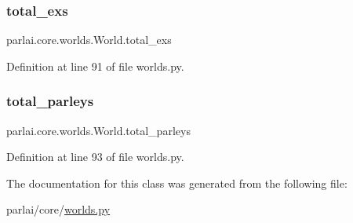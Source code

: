 \subsubsection{\texorpdfstring{total\+\_\+exs}{total\_exs}}
{\footnotesize\ttfamily parlai.\+core.\+worlds.\+World.\+total\+\_\+exs}



Definition at line 91 of file worlds.\+py.

\mbox{\label{classparlai_1_1core_1_1worlds_1_1World_ac23951eebe5c495ab2c79e57c960d681}} 
\subsubsection{\texorpdfstring{total\+\_\+parleys}{total\_parleys}}
{\footnotesize\ttfamily parlai.\+core.\+worlds.\+World.\+total\+\_\+parleys}



Definition at line 93 of file worlds.\+py.



The documentation for this class was generated from the following file\+:\begin{DoxyCompactItemize}
\item 
parlai/core/\hyperlink{parlai_2core_2worlds_8py}{worlds.\+py}\end{DoxyCompactItemize}
